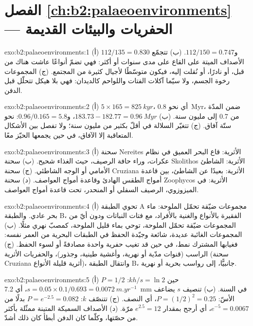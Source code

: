 \section*{الفصل \ref{ch:b2:palaeoenvironments} --- الحفريات والبيئات القديمة}

\begin{solution}{exo:b2:palaeoenvironments:1}
(أ) $112/135 = 0.830$ و$112/150 = 0.747$. (ب) تتجمّع الأصداف الميتة على القاع على مدى سنوات
أو أكثر: فهي تضمّ أنواعًا عاشت هناك من قبل، أو نادرًا، أو نُقلت إليه، فيكون
 متوسّطًا لأجيال كثيرة من المجتمع. (ج) المجموعات رخوة الجسم، ولا
سيّما آكلات الفتات واللواحم كالديدان: فهي بلا هيكل تتحلّل قبل الدفن.
\end{solution}

\begin{solution}{exo:b2:palaeoenvironments:2}
(أ) $5 \times 165 = \qty{825}{kyr}$، أي نحو \qty{0.8}{Myr}، ضمن المدّة من 0.7 إلى مليون سنة.
(ب) $183.73 - 182.77 = \qty{0.96}{Myr}$، و$0.96/0.165 = 5.8$: نحو ستّة آفاق. (ج)
تتغيّر السلالة في أقلّ بكثير من مليون سنة؛ ولا تفصل بين الأشكال المتعاقبة إلا الآفاق،
في حين يجمعها الحيّز معًا.
\end{solution}

\begin{solution}{exo:b2:palaeoenvironments:3}
(أ) سحنة Nereites الأثرية: قاع البحر العميق في نظام عكرات، وراء حافة الرصيف، حيث
الغذاء شحيح. (ب) سحنة Skolithos الأثرية: الشاطئ الأمامي أو الوجه الشاطئي. (ج) سحنة Cruziana الأثرية:
بعيدًا عن الشاطئ، بين قاعدة أمواج الطقس الهادئ وقاعدة أمواج العواصف. (د) سحنة Zoophycos الأثرية: في
الميزوزوي، الرصيف السفلي أو المنحدر، تحت قاعدة أمواج العواصف.
\end{solution}

\begin{solution}{exo:b2:palaeoenvironments:4}
(أ) تحوي الطبقة A مجموعات ضيّقة تحمّل الملوحة: ماء بحر عادي. والطبقة B، الفقيرة بالأنواع والغنية
بالأفراد، مع فتات النباتات ودون أيّ من المجموعات ضيّقة تحمّل الملوحة، توحي بماء قليل الملوحة،
كمصبّ نهري مثلًا. (ب) المجموعات الغائبة عديدة، شائعة وجيّدة الحفظ في الطبقات البحرية
من العمر نفسه: فغيابها المشترك نمط، في حين قد تغيب حفرية واحدة مصادفةً أو
لسوء الحفظ. (ج) الراسب (قنوات مدّية أو نهرية، وأغشية طينية، وجذور)، والحفريات
الأثرية (سحنة Cruziana أثرية قليلة الأنواع)، وانتقال الطبقة B، جانبيًّا، إلى
رواسب بحرية أو نهرية.
\end{solution}

\begin{solution}{exo:b2:palaeoenvironments:5}
(أ) $P = 1/2$ حين $kh/s = \ln 2$: $s = 0.05 \times 0.1/0.693 = \qty{0.0072}{m.yr^{-1}}$،
أي \qty{7.2}{mm} في السنة. (ب) تنصيف $s$ يضاعف الأسّ: $P = (1/2)^2 = 0.25$، أي النصف.
(ج) تتنصّف $k$: $P = e^{-2.5} = 0.082$ بدلًا من $e^{-5} = 0.0067$، أي أرجح بمقدار $e^{2.5} = 12$
مرّة. (د) الأصداف السميكة المتينة ممثّلة بأكثر من حصّتها، وكلّما كان الدفن أبطأ كان ذلك أشدّ.
\end{solution}

